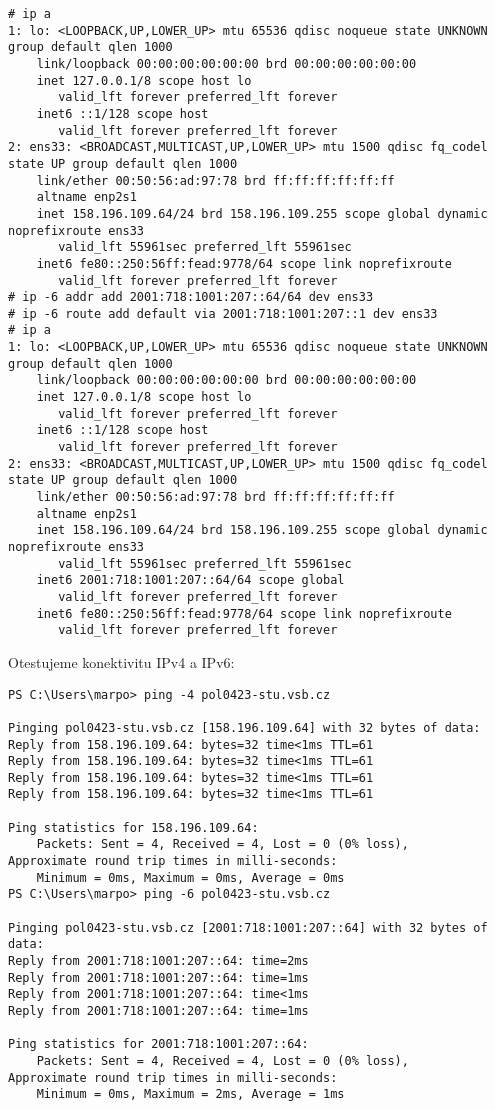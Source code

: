 \begin{verbatim}
# ip a
1: lo: <LOOPBACK,UP,LOWER_UP> mtu 65536 qdisc noqueue state UNKNOWN
group default qlen 1000
    link/loopback 00:00:00:00:00:00 brd 00:00:00:00:00:00
    inet 127.0.0.1/8 scope host lo
       valid_lft forever preferred_lft forever
    inet6 ::1/128 scope host
       valid_lft forever preferred_lft forever
2: ens33: <BROADCAST,MULTICAST,UP,LOWER_UP> mtu 1500 qdisc fq_codel
state UP group default qlen 1000
    link/ether 00:50:56:ad:97:78 brd ff:ff:ff:ff:ff:ff
    altname enp2s1
    inet 158.196.109.64/24 brd 158.196.109.255 scope global dynamic
noprefixroute ens33
       valid_lft 55961sec preferred_lft 55961sec
    inet6 fe80::250:56ff:fead:9778/64 scope link noprefixroute
       valid_lft forever preferred_lft forever
# ip -6 addr add 2001:718:1001:207::64/64 dev ens33
# ip -6 route add default via 2001:718:1001:207::1 dev ens33
# ip a
1: lo: <LOOPBACK,UP,LOWER_UP> mtu 65536 qdisc noqueue state UNKNOWN
group default qlen 1000
    link/loopback 00:00:00:00:00:00 brd 00:00:00:00:00:00
    inet 127.0.0.1/8 scope host lo
       valid_lft forever preferred_lft forever
    inet6 ::1/128 scope host
       valid_lft forever preferred_lft forever
2: ens33: <BROADCAST,MULTICAST,UP,LOWER_UP> mtu 1500 qdisc fq_codel
state UP group default qlen 1000
    link/ether 00:50:56:ad:97:78 brd ff:ff:ff:ff:ff:ff
    altname enp2s1
    inet 158.196.109.64/24 brd 158.196.109.255 scope global dynamic
noprefixroute ens33
       valid_lft 55961sec preferred_lft 55961sec
    inet6 2001:718:1001:207::64/64 scope global
       valid_lft forever preferred_lft forever
    inet6 fe80::250:56ff:fead:9778/64 scope link noprefixroute
       valid_lft forever preferred_lft forever
\end{verbatim}

Otestujeme konektivitu IPv4 a IPv6:

\begin{verbatim}
PS C:\Users\marpo> ping -4 pol0423-stu.vsb.cz

Pinging pol0423-stu.vsb.cz [158.196.109.64] with 32 bytes of data:
Reply from 158.196.109.64: bytes=32 time<1ms TTL=61
Reply from 158.196.109.64: bytes=32 time<1ms TTL=61
Reply from 158.196.109.64: bytes=32 time<1ms TTL=61
Reply from 158.196.109.64: bytes=32 time<1ms TTL=61

Ping statistics for 158.196.109.64:
    Packets: Sent = 4, Received = 4, Lost = 0 (0% loss),
Approximate round trip times in milli-seconds:
    Minimum = 0ms, Maximum = 0ms, Average = 0ms
PS C:\Users\marpo> ping -6 pol0423-stu.vsb.cz

Pinging pol0423-stu.vsb.cz [2001:718:1001:207::64] with 32 bytes of data:
Reply from 2001:718:1001:207::64: time=2ms
Reply from 2001:718:1001:207::64: time=1ms
Reply from 2001:718:1001:207::64: time<1ms
Reply from 2001:718:1001:207::64: time=1ms

Ping statistics for 2001:718:1001:207::64:
    Packets: Sent = 4, Received = 4, Lost = 0 (0% loss),
Approximate round trip times in milli-seconds:
    Minimum = 0ms, Maximum = 2ms, Average = 1ms
\end{verbatim}

